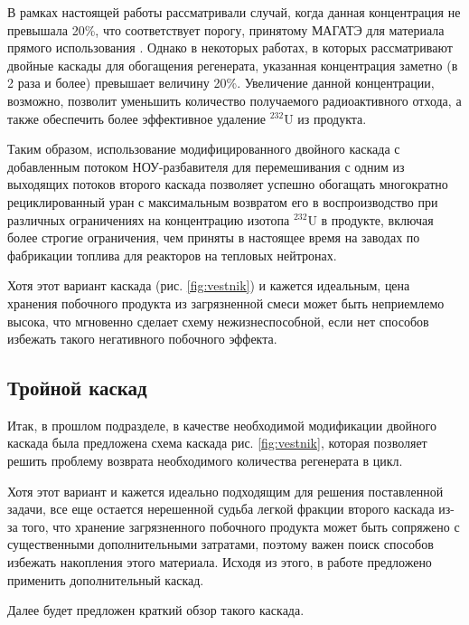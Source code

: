 В рамках настоящей работы рассматривали случай, когда данная концентрация не превышала 20\%, что соответствует порогу, принятому МАГАТЭ для материала прямого использования \cite{alekseevConceptUseRecycled2010}. Однако в некоторых работах, в которых рассматривают двойные каскады для обогащения регенерата, указанная концентрация заметно (в 2 раза и более) превышает величину 20\%. Увеличение данной концентрации, возможно, позволит уменьшить количество получаемого радиоактивного отхода, а также обеспечить более эффективное удаление $^{232}$U из продукта.

Таким образом, использование модифицированного двойного каскада с добавленным потоком НОУ-разбавителя для перемешивания с одним из выходящих потоков второго каскада позволяет успешно обогащать многократно рециклированный уран с максимальным возвратом его в воспроизводство при различных ограничениях на концентрацию изотопа $^{232}$U в продукте, включая более строгие ограничения, чем приняты в настоящее время на заводах по фабрикации топлива для реакторов на тепловых нейтронах.

Хотя этот вариант каскада (рис. \ref{fig:vestnik}) и кажется идеальным, цена хранения побочного продукта из загрязненной смеси может быть неприемлемо высока, что мгновенно сделает схему нежизнеспособной, если нет способов избежать такого негативного побочного эффекта.

\subsection{Тройной каскад}
Итак, в прошлом подразделе, в качестве необходимой модификации двойного каскада была предложена схема каскада рис. \ref{fig:vestnik}, которая позволяет решить проблему возврата необходимого количества регенерата в цикл.

Хотя этот вариант и кажется идеально подходящим для решения поставленной задачи, все еще остается нерешенной судьба легкой фракции второго каскада из-за того, что хранение загрязненного побочного продукта может быть сопряжено с существенными дополнительными затратами, поэтому важен поиск способов избежать накопления этого материала.
Исходя из этого, в работе \cite{smirnovMethodEnrichReprocessed2019} предложено применить дополнительный каскад.

Далее будет предложен краткий обзор такого каскада.
 
